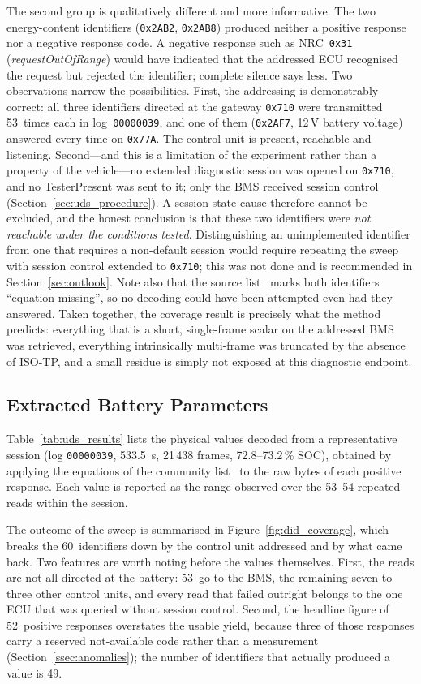 \documentclass[11pt,a4paper,oneside,parskip=half]{scrreprt}
\providecommand{\hex}{}\renewcommand{\hex}[1]{\texttt{0x#1}}
\begin{document}
The second group is qualitatively different and more informative. The two energy-content identifiers (\hex{2AB2}, \hex{2AB8}) produced neither a positive response nor a negative response code. A negative response such as NRC~\hex{31} (\emph{requestOutOfRange}) would have indicated that the addressed ECU recognised the request but rejected the identifier; complete silence says less. Two observations narrow the possibilities. First, the addressing is demonstrably correct: all three identifiers directed at the gateway \hex{710} were transmitted 53~times each in log~\texttt{00000039}, and one of them (\hex{2AF7}, 12\,V battery voltage) answered every time on \hex{77A}. The control unit is present, reachable and listening. Second---and this is a limitation of the experiment rather than a property of the vehicle---no extended diagnostic session was opened on \hex{710}, and no TesterPresent was sent to it; only the BMS received session control (Section~\ref{sec:uds_procedure}). A session-state cause therefore cannot be excluded, and the honest conclusion is that these two identifiers were \emph{not reachable under the conditions tested}. Distinguishing an unimplemented identifier from one that requires a non-default session would require repeating the sweep with session control extended to \hex{710}; this was not done and is recommended in Section~\ref{sec:outlook}. Note also that the source list~\cite{vwmebpidlist} marks both identifiers ``equation missing'', so no decoding could have been attempted even had they answered. Taken together, the coverage result is precisely what the method predicts: everything that is a short, single-frame scalar on the addressed BMS was retrieved, everything intrinsically multi-frame was truncated by the absence of ISO-TP, and a small residue is simply not exposed at this diagnostic endpoint.

\subsection{Extracted Battery Parameters}
Table~\ref{tab:uds_results} lists the physical values decoded from a representative session (log \texttt{00000039}, 533.5~s, 21\,438 frames, 72.8--73.2\,\% SOC), obtained by applying the equations of the community list~\cite{vwmebpidlist} to the raw bytes of each positive response. Each value is reported as the range observed over the 53--54 repeated reads within the session.

The outcome of the sweep is summarised in Figure~\ref{fig:did_coverage}, which breaks the 60~identifiers down by the control unit addressed and by what came back. Two features are worth noting before the values themselves. First, the reads are not all directed at the battery: 53~go to the BMS, the remaining seven to three other control units, and every read that failed outright belongs to the one ECU that was queried without session control. Second, the headline figure of 52~positive responses overstates the usable yield, because three of those responses carry a reserved not-available code rather than a measurement (Section~\ref{ssec:anomalies}); the number of identifiers that actually produced a value is 49.
\end{document}
